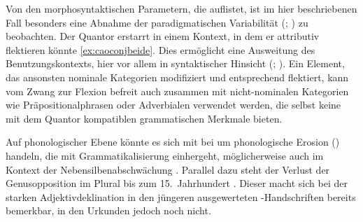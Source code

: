Von den morphosyntaktischen Parametern, die \citet[174]{lehmann2015} auflistet,
ist im hier beschriebenen Fall besonders eine Abnahme der paradigmatischen
Variabilität (; \cite[146--150]{lehmann2015}) zu
beobachten. Der Quantor erstarrt in einem Kontext, in dem er attributiv
flektieren könnte \cref{ex:caoconjbeide}. Dies ermöglicht eine Ausweitung des
Benutzungskontexts, hier vor allem in syntaktischer Hinsicht (; \cite[150--151]{lehmann2015}). Ein Element, das
ansonsten nominale Kategorien modifiziert und entsprechend flektiert, kann vom
Zwang zur Flexion befreit auch zusammen mit nicht-nominalen Kategorien wie
Präpositionalphrasen oder Adverbialen verwendet werden, die selbst keine mit
dem Quantor kompatiblen grammatischen Merkmale bieten.

Auf phonologischer Ebene könnte es sich mit \citet[134--136]{lehmann2015} bei
 um phonologische Erosion () handeln,
die mit Grammatikalisierung einhergeht, möglicherweise auch im Kontext der
Nebensilbenabschwächung \autocite[88--92]{braune2018}. Parallel dazu steht der
Verlust der Genusopposition im Plural bis zum 15.~Jahrhundert
\autocites[203]{paul2007}[191--192]{reichmannwegera1993}. Dieser macht sich bei
der starken Adjektivdeklination in den jüngeren ausgewerteten
\KC{}-Handschriften bereits bemerkbar, in den Urkunden jedoch noch nicht.

